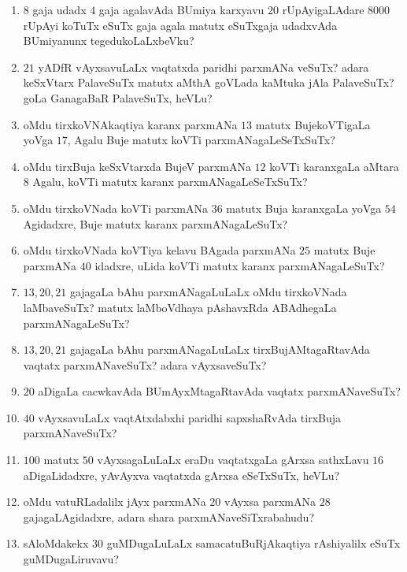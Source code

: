 \begin{enumerate}
\item $8$ gaja udadx $4$ gaja agalavAda BUmiya karxyavu $20$
rUpAyigaLAdare $8000$ rUpAyi koTuTx eSuTx gaja agala matutx eSuTxgaja
udadxvAda BUmiyanunx tegedukoLaLxbeVku?

\item $21$ yADfR vAyxsavuLaLx vaqtatxda paridhi parxmANa veSuTx? adara
keSxVtarx PalaveSuTx matutx aMthA goVLada kaMtuka jAla PalaveSuTx?
goLa GanagaBaR PalaveSuTx, heVLu?

\item oMdu tirxkoVNAkaqtiya karanx parxmANa $13$ matutx BujekoVTigaLa
yoVga $17$, Agalu Buje matutx koVTi parxmANagaLeSeTxSuTx?

\item oMdu tirxBuja keSxVtarxda BujeV parxmANa $12$ koVTi karanxgaLa
aMtara $8$ Agalu, koVTi matutx karanx parxmANagaLeSeTxSuTx?

\item oMdu tirxkoVNada koVTi parxmANa $36$ matutx Buja karanxgaLa
yoVga $54$ Agidadxre, Buje matutx karanx parxmANagaLeSuTx?

\item oMdu tirxkoVNada koVTiya kelavu BAgada parxmANa $25$ matutx Buje
parxmANa $40$ idadxre, uLida koVTi matutx karanx parxmANagaLeSuTx?

\item $13, 20, 21$ gajagaLa bAhu parxmANagaLuLaLx oMdu tirxkoVNada
laMbaveSuTx? matutx laMboVdhaya pAshavxRda ABAdhegaLa
parxmANagaLeSuTx?

\item $13, 20, 21$ gajagaLa bAhu parxmANagaLuLaLx tirxBujAMtagaRtavAda
vaqtatx parxmANaveSuTx? adara vAyxsaveSuTx?

\item $20$ aDigaLa cacwkavAda BUmAyxMtagaRtavAda vaqtatx
parxmANaveSuTx?

\item $40$ vAyxsavuLaLx vaqtAtxdabxhi paridhi sapxshaRvAda tirxBuja
parxmANaveSuTx? 

\item $100$ matutx $50$ vAyxsagaLuLaLx eraDu vaqtatxgaLa gArxsa
sathxLavu $16$ aDigaLidadxre, yAvAyxva vaqtatxda gArxsa eSeTxSuTx,
heVLu?

\item oMdu vatuRLadalilx jAyx parxmANa $20$ vAyxsa parxmANa $28$
gajagaLAgidadxre, adara shara parxmANaveSiTxrabahudu?

\item sAloMdakekx $30$ guMDugaLuLaLx samacatuBuRjAkaqtiya rAshiyalilx
eSuTx guMDugaLiruvavu?


\end{enumerate}
